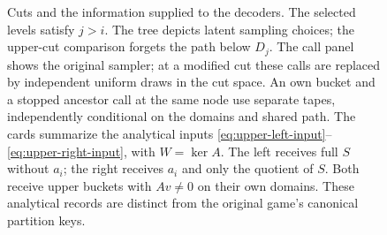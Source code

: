 \begin{figure}[p]
\caption{Cuts and the information supplied to the decoders.
The selected levels satisfy $j>i$.  The tree depicts latent sampling
choices; the upper-cut comparison forgets the path below $D_j$.
The call panel shows the original sampler; at a modified cut these calls
are replaced by independent uniform draws in the cut space.
An own bucket and a stopped ancestor call at the same node use separate
tapes, independently conditional on the domains and shared path.
The cards summarize the analytical inputs
\eqref{eq:upper-left-input}--\eqref{eq:upper-right-input}, with $W=\ker A$.
The left receives full $S$ without $a_i$; the right receives $a_i$ and
only the quotient of $S$.  Both receive upper buckets with $Av\ne0$ on
their own domains.  These analytical records are distinct from the
original game's canonical partition keys.}
\label{fig:tree-cut}
\end{figure}
